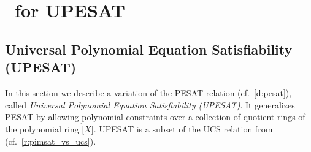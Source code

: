 \section{\ftwoz \  for UPESAT}



\subsection{Universal Polynomial Equation Satisfiability (UPESAT)}



In this section we describe a variation of the PESAT  relation (cf.\ \cref{d:pesat}), called \emph{Universal Polynomial Equation Satisfiability (UPESAT)}. It generalizes PESAT by allowing polynomial constraints over a collection of quotient rings of the polynomial ring $\ring[X]$. UPESAT is a subset of the UCS relation from \cite{zincplus} (cf.\ \cref{r:pimsat_vs_ucs}). %



 



